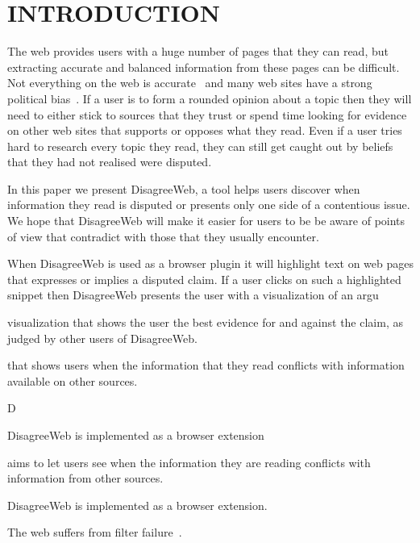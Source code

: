 \documentclass{chi2009}
\begin{document}

\section{INTRODUCTION}

The web provides users with a huge number of pages that they can read, but extracting accurate and balanced information from these pages can be difficult. Not everything on the web is accurate~\cite{Mintz2002,Neumann2003,Resnik98,Zhou2004} and many web sites have a strong political bias~\cite{Herman2002,Genzkow2007}. If a user is to form a rounded opinion about a topic then they will need to either stick to sources that they trust or spend time looking for evidence on other web sites that supports or opposes what they read. Even if a user tries hard to research every topic they read, they can still get caught out by beliefs that they had not realised were disputed.

In this paper we present DisagreeWeb, a tool helps users discover when information they read is disputed or presents only one side of a contentious issue. We hope that DisagreeWeb will make it easier for users to be be aware of points of view that contradict with those that they usually encounter.

When DisagreeWeb is used as a browser plugin it will highlight text on web pages that expresses or implies a disputed claim. If a user clicks on such a highlighted snippet then DisagreeWeb presents the user with a visualization of an argu

visualization that shows the user the best evidence for and against the claim, as judged by other users of DisagreeWeb.






that shows users when the information that they read conflicts with information available on other sources.

D

 DisagreeWeb is implemented as a browser extension 



aims to let users see when the information they are reading conflicts with information from other sources.

DisagreeWeb is implemented as a browser extension. 


The web suffers from filter failure~\cite{Shirky2008}. 
\end{document}
